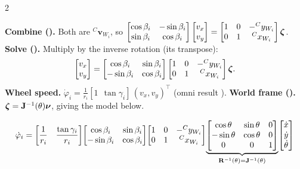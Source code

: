 \begin{multicols}{2}
\begin{deriv}
\textbf{Combine ().} Both are ${}^{C}\mathbf v_{W_i}$, so
$\begin{bmatrix}\cos\beta_i&-\sin\beta_i\\\sin\beta_i&\cos\beta_i\end{bmatrix}\begin{bmatrix}v_x\\v_y\end{bmatrix}=\begin{bmatrix}1&0&-{}^{C}y_{W_{i}}\\0&1&{}^{C}x_{W_{i}}\end{bmatrix}\boldsymbol\zeta$.
\textbf{Solve ().} Multiply by the inverse rotation (its transpose):
\[\begin{bmatrix}v_x\\v_y\end{bmatrix}=\begin{bmatrix}\cos\beta_i&\sin\beta_i\\-\sin\beta_i&\cos\beta_i\end{bmatrix}\begin{bmatrix}1&0&-{}^{C}y_{W_{i}}\\0&1&{}^{C}x_{W_{i}}\end{bmatrix}\boldsymbol\zeta.\]
\textbf{Wheel speed.} $\dot\varphi_i=\frac1{r_i}[1\ \ \tan\gamma_i]\,(v_x,v_y)^\top$ (omni result ). \textbf{World frame ().} $\boldsymbol\zeta=\mathbf J^{-1}(\theta)\boldsymbol\nu$, giving the model below.
\end{deriv}
\begin{fbx}
\[\dot\varphi_i=\begin{bmatrix}\dfrac1{r_i}&\dfrac{\tan\gamma_i}{r_i}\end{bmatrix}\!\begin{bmatrix}\cos\beta_i&\sin\beta_i\\-\sin\beta_i&\cos\beta_i\end{bmatrix}\!\begin{bmatrix}1&0&-{}^{C}y_{W_{i}}\\0&1&{}^{C}x_{W_{i}}\end{bmatrix}\!\underbrace{\begin{bmatrix}\cos\theta&\sin\theta&0\\-\sin\theta&\cos\theta&0\\0&0&1\end{bmatrix}}_{\mathbf R^{-1}(\theta)=\mathbf J^{-1}(\theta)}\!\begin{bmatrix}\dot x\\\dot y\\\dot\theta\end{bmatrix}\]

\end{fbx}
\end{multicols}

